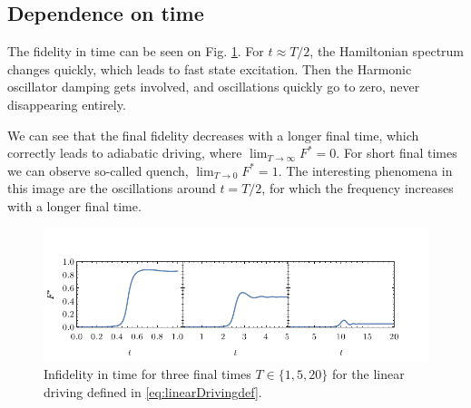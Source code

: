\subsection{Dependence on time}
The fidelity in time can be seen on Fig. \ref{fig:infidelityTimePlotLin}. For $t\approx T/2$, the Hamiltonian spectrum changes quickly, which leads to fast state excitation. Then the Harmonic oscillator damping gets involved, and oscillations quickly go to zero, never disappearing entirely.

We can see that the final fidelity decreases with a longer final time, which correctly leads to adiabatic driving, where $\lim_{T\rightarrow \infty} F^*=0$. For short final times we can observe so-called quench, $\lim_{T\rightarrow 0} F^*=1$. The interesting phenomena in this image are the oscillations around $t=T/2$, for which the frequency increases with a longer final time. 

\begin{figure}[H]
    \centering 
    \includegraphics[scale=1.185]{../img/infidelityInTimePlot1.pdf}
    \caption{Infidelity in time for three final times $T\in\{1,5,20\}$ for the linear driving defined in \ref{eq:linearDrivingdef}.}
  \label{fig:infidelityTimePlotLin}
\end{figure}


